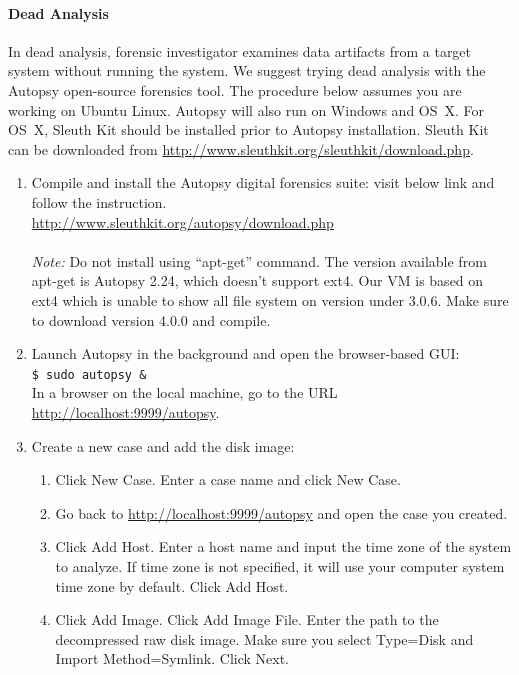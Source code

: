 \documentclass[letterpaper,12pt]{report}
\begin{document}
\paragraph{Dead Analysis}
In dead analysis, forensic investigator examines data artifacts from a target system without running the system. We suggest trying dead analysis with the Autopsy open-source forensics tool. The procedure below assumes you are working on Ubuntu Linux. Autopsy will also run on Windows and OS~X. For OS~X, Sleuth Kit should be installed prior to Autopsy installation.  Sleuth Kit can be downloaded from \url{http://www.sleuthkit.org/sleuthkit/download.php}.

\begin{enumerate}
\item Compile and install the Autopsy digital forensics suite: visit below link and follow the instruction.\\
    \url{http://www.sleuthkit.org/autopsy/download.php}\\ \\
    \textit{Note:} Do not install using ``apt-get'' command. The version available from apt-get is Autopsy 2.24, which doesn't support ext4. Our VM is based on ext4 which is unable to show all file system on version under 3.0.6. Make sure to download version 4.0.0 and compile.
\item Launch Autopsy in the background and open the browser-based GUI:\\
    \texttt{\$ sudo autopsy \&}\\
    In a browser on the local machine, go to the URL \url{http://localhost:9999/autopsy}.
\item Create a new case and add the disk image:
    \begin{enumerate}
        \item Click New Case.  Enter a case name and click New Case.
        \item Go back to \url{http://localhost:9999/autopsy} and open the case you created.
        \item Click Add Host.  Enter a host name and input the time zone of the system to analyze. If time zone is not specified, it will use your computer system time zone by default. Click Add Host.
        \item Click Add Image.  Click Add Image File.  Enter the path to the decompressed raw disk image.  Make sure you select  Type=Disk and Import Method=Symlink.  Click Next.

\end{enumerate}
\end{enumerate}
\end{document}
